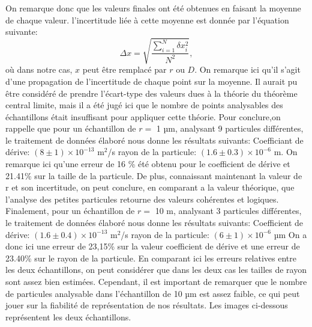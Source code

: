 \documentclass[11pt,letterpaper]{article}
\begin{document}
On remarque donc que les valeurs finales ont été obtenues en faisant la moyenne de chaque valeur. l'incertitude liée à cette moyenne est donnée
par l'équation suivante: 
\[
  \Delta x = \sqrt{\frac{\sum_{i=1}^N \delta x_{i}^2}{N^2}},
\]
où dans notre cas, $x$ peut être remplacé par $r$ ou $D$. On remarque ici qu'il s'agit d'une propagation de l’incertitude de chaque point sur la 
moyenne. Il aurait pu être considéré de prendre l'écart-type des valeurs dues à la théorie du théorème central limite, mais il a été jugé ici que le nombre de points 
analysables des échantillons était insuffisant pour appliquer cette théorie. 
Pour conclure,on rappelle que pour un échantillon de $r =$ 1 µm, analysant 9 particules différentes, 
le traitement de données élaboré nous donne les résultats suivants: 
Coefficiant de dérive: $(8 \pm 1) \times 10^{-13}$ m$^{2}$/s
rayon de la particule: $(1.6 \pm 0.3)\times 10^{-6}$ m.
On remarque ici qu'une erreur de 16 \% été obtenu pour le coefficient de dérive et 21.41\% sur la taille de la particule.
De plus, connaissant maintenant la valeur de r et son incertitude, on peut conclure, en comparant a la valeur théorique, que l'analyse 
des petites particules retourne des valeurs cohérentes et logiques. 
Finalement, pour un échantillon de $r =$ 10 m, analysant 3 particules différentes, 
le traitement de données élaboré nous donne les résultats suivants: 
Coefficient de dérive: $(1.6 \pm 0.4) \times 10^{-13}$ m$^{2}$/s
rayon de la particule: $(6 \pm 1)\times 10^{-6}$ µm
On a donc ici une erreur de 23,15\% sur la valeur coefficient de dérive et une erreur de 23.40\% sur le rayon de la particule. 
En comparant ici les erreurs relatives entre les deux échantillons, on peut considérer que dans les deux cas les tailles de rayon sont assez bien estimées. Cependant, il est important de remarquer que le nombre de particules analysable dans l'échantillon de 10 µm est assez faible, ce qui 
peut jouer sur la fiabilité de représentation de nos résultats. Les images ci-dessous représentent les deux échantillons. 
\end{document}
